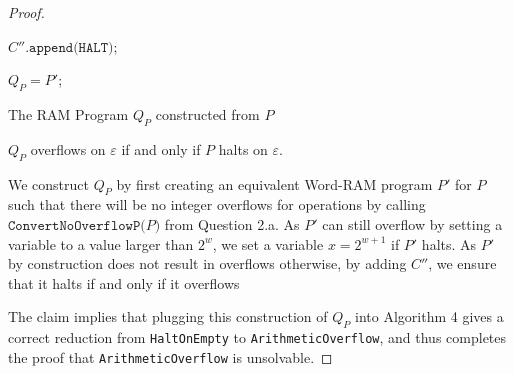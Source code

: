\documentclass[11pt]{scrartcl}
\theoremstyle{dotlessP}
\theoremstyle{dotlessN}
\begin{document}
\begin{enumerate}[(a)]
\begin{proof}
\begin{algorithm}[H]
	  $C''\texttt{.append(HALT)}$;
		
	  $Q_P = P'$;

	  \caption{The RAM Program $Q_P$ constructed from $P$}
\end{algorithm}

\begin{claim*}
	$Q_P$ overflows on $\varepsilon$ if and only if  $P$ halts on $\varepsilon$.
\end{claim*}
\begin{subproof}
	We construct $Q_P$ by first creating an equivalent Word-RAM program $P'$ for $P$ such that there will be no integer overflows for operations by calling $\texttt{ConvertNoOverflowP($P$)}$ from Question 2.a. As $P'$ can still overflow by setting a variable to a value larger than $2^w$, we set a variable $x = 2^{w+1}$ if $P'$ halts. As $P'$ by construction does not result in overflows otherwise, by adding $C''$, we ensure that it halts if and only if it overflows
\end{subproof}
The claim implies that plugging this construction of $Q_P$ into Algorithm 4 gives a correct reduction from \texttt{HaltOnEmpty} to \texttt{ArithmeticOverflow}, and thus completes the proof that \texttt{ArithmeticOverflow} is unsolvable.
		\end{proof}
\end{enumerate}
\end{document}
